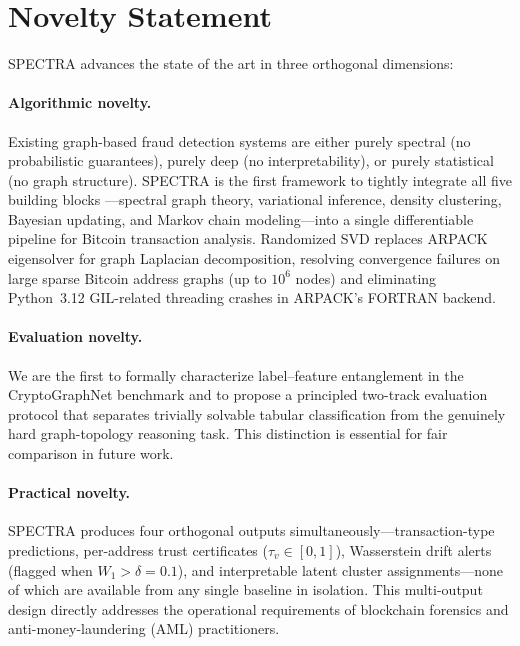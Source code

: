 
\section*{Novelty Statement}

\textsc{SPECTRA} advances the state of the art in three orthogonal dimensions:

\paragraph{Algorithmic novelty.}
Existing graph-based fraud detection systems are either purely spectral
(no probabilistic guarantees), purely deep (no interpretability), or
purely statistical (no graph structure).
SPECTRA is the first framework to tightly integrate all five building blocks
---spectral graph theory, variational inference, density clustering,
Bayesian updating, and Markov chain modeling---into a single differentiable
pipeline for Bitcoin transaction analysis.
Randomized SVD replaces ARPACK eigensolver for graph Laplacian decomposition,
resolving convergence failures on large sparse Bitcoin address graphs
(up to $10^6$ nodes) and eliminating Python~3.12 GIL-related threading
crashes in ARPACK's FORTRAN backend.

\paragraph{Evaluation novelty.}
We are the first to formally characterize label--feature entanglement
in the CryptoGraphNet benchmark and to propose a principled two-track
evaluation protocol that separates trivially solvable tabular classification
from the genuinely hard graph-topology reasoning task.
This distinction is essential for fair comparison in future work.

\paragraph{Practical novelty.}
SPECTRA produces four orthogonal outputs simultaneously---transaction-type
predictions, per-address trust certificates ($\tau_v \in [0,1]$),
Wasserstein drift alerts (flagged when $W_1 > \delta = 0.1$), and
interpretable latent cluster assignments---none of which are available
from any single baseline in isolation.
This multi-output design directly addresses the operational requirements
of blockchain forensics and anti-money-laundering (AML) practitioners.
